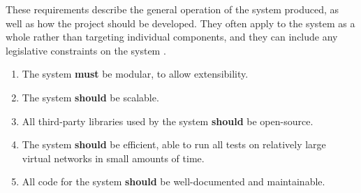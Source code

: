 
These requirements describe the general operation of the system produced, as well as how the project should be developed. They often apply to the system as a whole rather than targeting individual components, and they can include any legislative constraints on the system \cite{software_engineering_req_analysis}.

\begin{enumerate}[label=\textbf{NF\arabic*:}]
    \item The system \textbf{must} be modular, to allow extensibility.
    \item The system \textbf{should} be scalable.
    \item All third-party libraries used by the system \textbf{should} be open-source.
    \item The system \textbf{should} be efficient, able to run all tests on relatively large virtual networks in small amounts of time.
    \item All code for the system \textbf{should} be well-documented and maintainable.
\end{enumerate}


